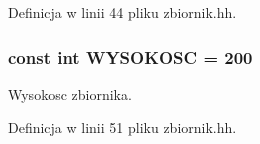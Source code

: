 Definicja w linii 44 pliku zbiornik.\-hh.

\hypertarget{zbiornik_8hh_a073767f0ac7dbf009a42b00de1092b52}{
\subsubsection[{W\-Y\-S\-O\-K\-O\-S\-C}]{\setlength{\rightskip}{0pt plus 5cm}const int W\-Y\-S\-O\-K\-O\-S\-C = 200}}\label{zbiornik_8hh_a073767f0ac7dbf009a42b00de1092b52}
Wysokosc zbiornika. 

Definicja w linii 51 pliku zbiornik.\-hh.

